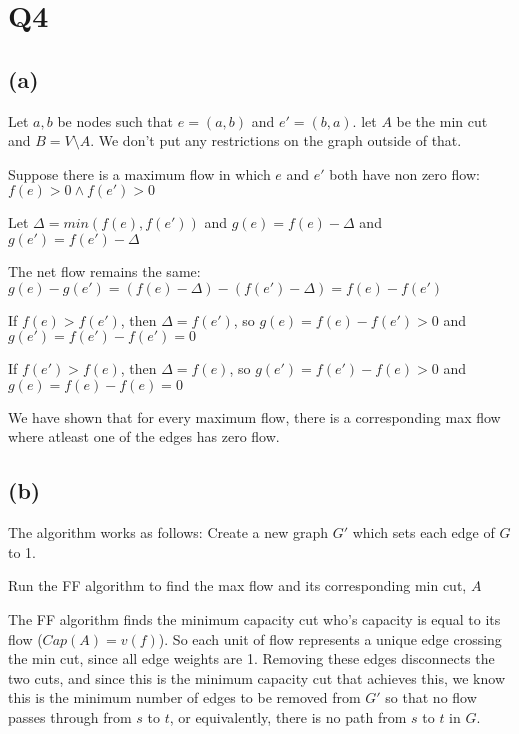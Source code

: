 \section*{Q4}

\subsection*{(a)}
\begin{center}
\end{center}

Let $a,b$ be nodes such that $e = (a,b)$ and $e' = (b,a)$. let $A$ be the min cut and $B = V \setminus A$. We don't put any restrictions on the graph outside of that.

Suppose there is a maximum flow in which $e$ and $e'$ both have non zero flow: $f(e) > 0 \wedge f(e') > 0$

Let $\Delta = min(f(e),f(e'))$ and $g(e)=f(e)-\Delta$ and $g(e')=f(e')-\Delta$

The net flow remains the same: $g(e)-g(e') = (f(e)-\Delta) - (f(e')-\Delta) = f(e)-f(e')$

If $f(e)>f(e')$, then $\Delta=f(e')$, so $g(e)=f(e)-f(e')>0$ and $g(e')=f(e')-f(e')=0$

If $f(e')>f(e)$, then $\Delta=f(e)$, so $g(e')=f(e')-f(e)>0$ and $g(e)=f(e)-f(e)=0$

We have shown that for every maximum flow, there is a corresponding max flow where atleast one of the edges has zero flow.

\subsection*{(b)}
The algorithm works as follows:
Create a new graph $G'$ which sets each edge of $G$ to 1.

Run the FF algorithm to find the max flow and its corresponding min cut, $A$

The FF algorithm finds the minimum capacity cut who's capacity is equal to its flow ($Cap(A) = v(f)$). So each unit of flow represents a unique edge crossing the min cut, since all edge weights are 1. Removing these edges disconnects the two cuts, and since this is the minimum capacity cut that achieves this, we know this is the minimum number of edges to be removed from $G'$ so that no flow passes through from $s$ to $t$, or equivalently, there is no path from $s$ to $t$ in $G$.